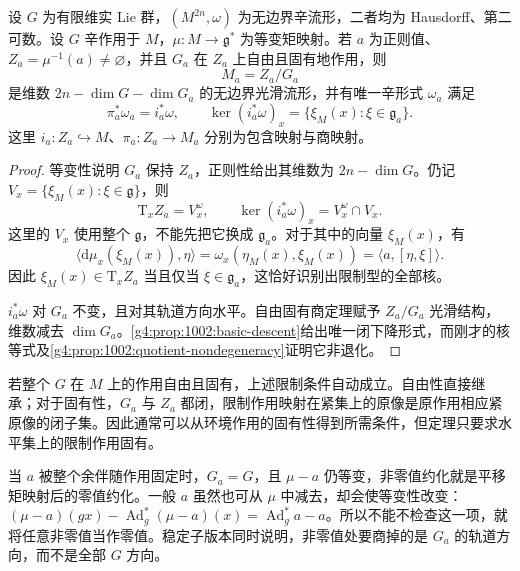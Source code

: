 \begin{theorem}\label{g4:thm:1002:nonzero-reduction}
	设 \(G\) 为有限维实 Lie 群，\((M^{2n},\omega)\) 为无边界辛流形，二者均为 Hausdorff、第二可数。设 \(G\) 辛作用于 \(M\)，\(\mu:M\to\mathfrak g^*\) 为等变矩映射。若 \(a\) 为正则值、\(Z_a=\mu^{-1}(a)\ne\varnothing\)，并且 \(G_a\) 在 \(Z_a\) 上自由且固有地作用，则
	\[
		M_a=Z_a/G_a
	\]
	是维数 \(2n-\dim G-\dim G_a\) 的无边界光滑流形，并有唯一辛形式 \(\omega_a\) 满足
	\begin{equation}\label{g4:eq:1002:nonzero-reduction}
		\pi_a^*\omega_a=i_a^*\omega,
		\qquad
		\ker(i_a^*\omega)_x=\{\xi_M(x):\xi\in\mathfrak g_a\}.
	\end{equation}
	这里 \(i_a:Z_a\hookrightarrow M\)、\(\pi_a:Z_a\to M_a\) 分别为包含映射与商映射。
\end{theorem}
\begin{proof}
	等变性说明 \(G_a\) 保持 \(Z_a\)，正则性给出其维数为 \(2n-\dim G\)。仍记 \(V_x=\{\xi_M(x):\xi\in\mathfrak g\}\)，则
	\[
		\mathrm{T}_xZ_a=V_x^\omega,
		\qquad
		\ker(i_a^*\omega)_x=V_x^\omega\cap V_x.
	\]
	这里的 \(V_x\) 使用整个 \(\mathfrak g\)，不能先把它换成 \(\mathfrak g_a\)。对于其中的向量 \(\xi_M(x)\)，有
	\[
		\langle\mathrm{d}\mu_x(\xi_M(x)),\eta\rangle
		=\omega_x(\eta_M(x),\xi_M(x))
		=\langle a,[\eta,\xi]\rangle.
	\]
	因此 \(\xi_M(x)\in\mathrm{T}_xZ_a\) 当且仅当 \(\xi\in\mathfrak g_a\)，这恰好识别出限制型的全部核。

	\(i_a^*\omega\) 对 \(G_a\) 不变，且对其轨道方向水平。自由固有商定理赋予 \(Z_a/G_a\) 光滑结构，维数减去 \(\dim G_a\)。\cref{g4:prop:1002:basic-descent}给出唯一闭下降形式，而刚才的核等式及\cref{g4:prop:1002:quotient-nondegeneracy}证明它非退化。
\end{proof}

若整个 \(G\) 在 \(M\) 上的作用自由且固有，上述限制条件自动成立。自由性直接继承；对于固有性，\(G_a\) 与 \(Z_a\) 都闭，限制作用映射在紧集上的原像是原作用相应紧原像的闭子集。因此通常可以从环境作用的固有性得到所需条件，但定理只要求水平集上的限制作用固有。

\ProseParagraphBreak

当 \(a\) 被整个余伴随作用固定时，\(G_a=G\)，且 \(\mu-a\) 仍等变，非零值约化就是平移矩映射后的零值约化。一般 \(a\) 虽然也可从 \(\mu\) 中减去，却会使等变性改变：\((\mu-a)(gx)-\operatorname{Ad}_g^*(\mu-a)(x)=\operatorname{Ad}_g^*a-a\)。所以不能不检查这一项，就将任意非零值当作零值。稳定子版本同时说明，非零值处要商掉的是 \(G_a\) 的轨道方向，而不是全部 \(G\) 方向。
